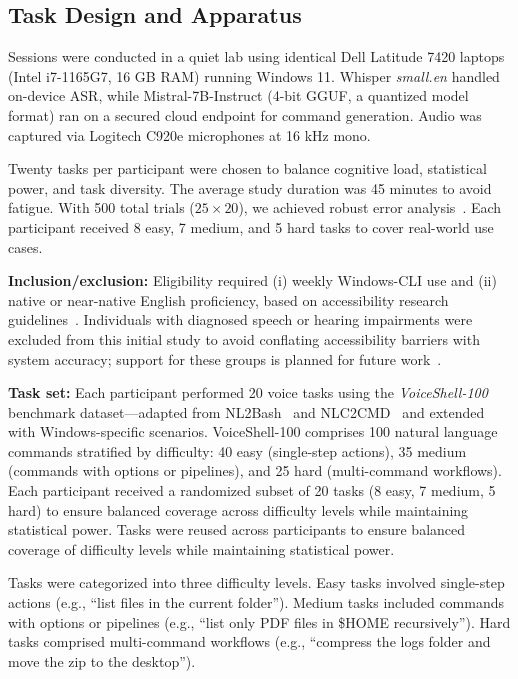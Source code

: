 \documentclass[a4paper,12pt]{article}
\begin{document}
\subsection{Task Design and Apparatus}
\noindent Sessions were conducted in a quiet lab using identical Dell Latitude 7420 laptops (Intel i7-1165G7, 16 GB RAM) running Windows 11. Whisper \textit{small.en} handled on-device ASR, while Mistral-7B-Instruct (4-bit GGUF, a quantized model format) ran on a secured cloud endpoint for command generation. Audio was captured via Logitech C920e microphones at 16 kHz mono.

\noindent Twenty tasks per participant were chosen to balance cognitive load, statistical power, and task diversity. The average study duration was 45 minutes to avoid fatigue. With 500 total trials ($25 \times 20$), we achieved robust error analysis~\cite{ref4}. Each participant received 8 easy, 7 medium, and 5 hard tasks to cover real-world use cases. 

\noindent\textbf{Inclusion/exclusion:} Eligibility required (i) weekly Windows-CLI use and (ii) native or near-native English proficiency, based on accessibility research guidelines~\cite{ref3}. Individuals with diagnosed speech or hearing impairments were excluded from this initial study to avoid conflating accessibility barriers with system accuracy; support for these groups is planned for future work~\cite{ref4}.

\noindent\textbf{Task set:} Each participant performed 20 voice tasks using the \textit{VoiceShell-100} benchmark dataset—adapted from NL2Bash~\cite{ref26} and NLC2CMD~\cite{ref27} and extended with Windows-specific scenarios. VoiceShell-100 comprises 100 natural language commands stratified by difficulty: 40 easy (single-step actions), 35 medium (commands with options or pipelines), and 25 hard (multi-command workflows). Each participant received a randomized subset of 20 tasks (8 easy, 7 medium, 5 hard) to ensure balanced coverage across difficulty levels while maintaining statistical power. Tasks were reused across participants to ensure balanced coverage of difficulty levels while maintaining statistical power.

Tasks were categorized into three difficulty levels. Easy tasks involved single-step actions (e.g., ``list files in the current folder''). Medium tasks included commands with options or pipelines (e.g., ``list only PDF files in \$HOME recursively''). Hard tasks comprised multi-command workflows (e.g., ``compress the logs folder and move the zip to the desktop'').
\end{document}
